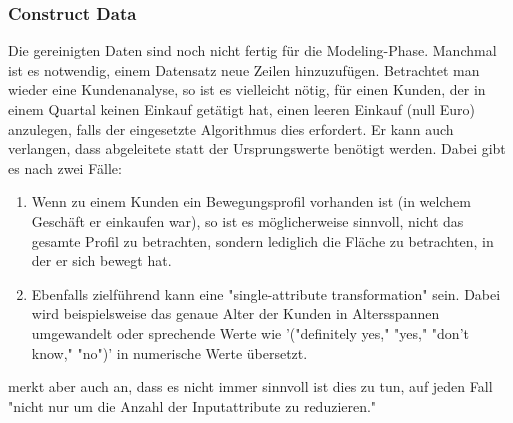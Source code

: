 \subsubsection{Construct Data}
Die gereinigten Daten sind noch nicht fertig für die Modeling-Phase. Manchmal ist es notwendig, einem Datensatz neue Zeilen hinzuzufügen. Betrachtet man wieder eine Kundenanalyse, so ist es vielleicht nötig, für einen Kunden, der in einem Quartal keinen Einkauf getätigt hat, einen leeren Einkauf (null Euro) anzulegen, falls der eingesetzte Algorithmus dies erfordert.\citep[S.~22]{chapman_crisp-dm_2000} Er kann auch verlangen, dass abgeleitete  statt der Ursprungswerte benötigt werden. Dabei gibt es nach \citep[S.~16]{shearer_crisp-dm_2000} zwei Fälle:
\begin{enumerate}
\item Wenn zu einem Kunden ein Bewegungsprofil vorhanden ist (in welchem Geschäft er einkaufen war), so ist es möglicherweise sinnvoll, nicht das gesamte Profil zu betrachten, sondern lediglich die Fläche zu betrachten, in der er sich bewegt hat.
\item Ebenfalls zielführend kann eine "single-attribute transformation" sein. Dabei wird beispielsweise das genaue Alter der Kunden in Altersspannen umgewandelt oder sprechende Werte wie '("definitely yes," "yes," "don't know," "no")' in numerische Werte übersetzt.
\end{enumerate}
\citep[S.~16; eigene Übersetzung]{shearer_crisp-dm_2000} merkt aber auch an, dass es nicht immer sinnvoll ist dies zu tun, auf jeden Fall "nicht nur um die Anzahl der Inputattribute zu reduzieren."

